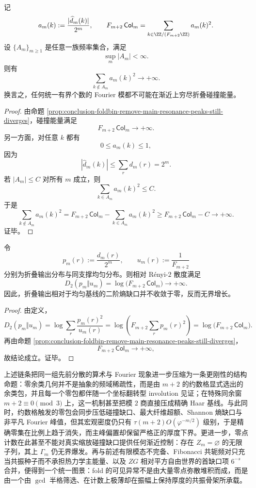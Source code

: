 \begin{theorem}[统一有界频窗不可能穷尽碰撞能量]\label{thm:conclusion-bounded-fourier-window-cannot-exhaust-collision-energy}
记
\[
a_m(k):=\frac{|\widehat d_m(k)|}{2^m},
\qquad
F_{m+2}\,\mathsf{Col}_m=\sum_{k\in \ZZ/(F_{m+2}\ZZ)} a_m(k)^2.
\]
设 \(\{A_m\}_{m\ge 1}\) 是任意一族频率集合，满足
\[
\sup_m |A_m|<\infty.
\]
则有
\[
\sum_{k\notin A_m} a_m(k)^2 \longrightarrow +\infty.
\]
换言之，任何统一有界个数的 Fourier 模都不可能在渐近上穷尽折叠碰撞能量。
\end{theorem}
\begin{proof}
由命题 \ref{prop:conclusion-foldbin-remove-main-resonance-peaks-still-diverges}，碰撞能量满足
\[
F_{m+2}\,\mathsf{Col}_m\to +\infty.
\]
另一方面，对任意 \(k\) 都有
\[
0\le a_m(k)\le 1,
\]
因为
\[
|\widehat d_m(k)|\le \sum_r d_m(r)=2^m.
\]
若 \(|A_m|\le C\) 对所有 \(m\) 成立，则
\[
\sum_{k\in A_m} a_m(k)^2\le C.
\]
于是
\[
\sum_{k\notin A_m} a_m(k)^2
=
F_{m+2}\,\mathsf{Col}_m-\sum_{k\in A_m} a_m(k)^2
\ge
F_{m+2}\,\mathsf{Col}_m-C\to +\infty.
\]
证毕。
\end{proof}

\begin{corollary}\label{cor:conclusion-renyi2-gap-diverges}
令
\[
p_m(r):=\frac{d_m(r)}{2^m},
\qquad
u_m(r):=\frac1{F_{m+2}}
\]
分别为折叠输出分布与同支撑均匀分布。则相对 Rényi-\(2\) 散度满足
\[
D_2(p_m\Vert u_m)
=
\log\!\bigl(F_{m+2}\,\mathsf{Col}_m\bigr)
\longrightarrow +\infty.
\]
因此，折叠输出相对于均匀基线的二阶熵缺口并不收敛于零，反而无界增长。
\end{corollary}
\begin{proof}
由定义，
\[
D_2(p_m\Vert u_m)
=
\log\sum_r \frac{p_m(r)^2}{u_m(r)}
=
\log\!\left(F_{m+2}\sum_r p_m(r)^2\right)
=
\log\!\bigl(F_{m+2}\,\mathsf{Col}_m\bigr).
\]
再由命题 \ref{prop:conclusion-foldbin-remove-main-resonance-peaks-still-diverges}，
\[
F_{m+2}\,\mathsf{Col}_m\to +\infty,
\]
故结论成立。证毕。
\end{proof}




\noindent
上述链条把同一组先前分散的算术与 Fourier 现象进一步压缩为一条更刚性的结构命题：零余类几何并不是抽象的频域稀疏性，而是由 \(m+2\) 的约数格显式选出的余类包，并且每一个零包都伴随一个坐标翻转型 involution 见证；在特殊同余窗 \(m+2\equiv 0\pmod 3\) 上，这一机制甚至把模 \(2\) 商直接压成精确 Haar 基线。与此同时，约数格触发的零包会同步压低碰撞缺口、最大纤维超额、Shannon 熵缺口与非平凡 Fourier 峰值，但其宏观密度仍只有 \(\tau(m+2)O(\varphi^{-m/2})\) 级别，于是精确零集在比例上趋于消失，而主峰偏置却保留严格正的厚度下界。更进一步，零点计数在此甚至不能对真实缩放碰撞缺口提供任何渐近控制：存在 \(Z_m=\varnothing\) 的无限子列，其上 \(\Gamma_m\) 仍无界爆发。再与前述有限模态不完备、Fibonacci 共轭频对只充当共振种子而不承担热力学主能量、以及 \(ZG\) 相对平方自由世界的首缺口项 \(6^{-s}\) 合并，便得到一个统一图景：fold 的可见异常不是由大量零点弥散堆积而成，而是由一个由 \(\gcd\) 半格筛选、在计数上极薄却在振幅上保持厚度的共振骨架所承载。

\endinput
